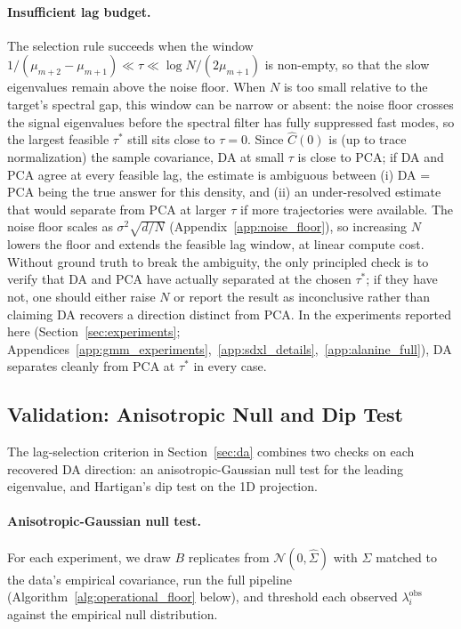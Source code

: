 \documentclass{article}
\begin{document}
\paragraph{Insufficient lag budget.}
The selection rule succeeds when the window
$1/(\mu_{m+2} - \mu_{m+1}) \ll \tau \ll \log N / (2\mu_{m+1})$ is non-empty, so that the slow eigenvalues remain above the noise floor.
When $N$ is too small relative to the target's spectral gap, this
window can be narrow or absent: the noise floor crosses the signal
eigenvalues before the spectral filter has fully suppressed fast
modes, so the largest feasible $\tau^*$ still sits close to $\tau = 0$.
Since $\hat C(0)$ is (up to trace normalization) the sample covariance,
DA at small $\tau$ is close to PCA; if DA and PCA agree at every
feasible lag, the estimate is ambiguous between (i) DA = PCA being the
true answer for this density, and (ii) an under-resolved estimate that
would separate from PCA at larger $\tau$ if more trajectories were
available. The noise floor scales as $\sigma^2\sqrt{d/N}$
(Appendix~\ref{app:noise_floor}), so increasing $N$ lowers the floor
and extends the feasible lag window, at linear compute cost. Without
ground truth to break the ambiguity, the only principled check is to
verify that DA and PCA have actually separated at the chosen $\tau^*$;
if they have not, one should either raise $N$ or report the result as
inconclusive rather than claiming DA recovers a direction distinct from
PCA. In the experiments reported here (Section~\ref{sec:experiments}; Appendices~\ref{app:gmm_experiments},~\ref{app:sdxl_details},~\ref{app:alanine_full}), DA separates cleanly from PCA at $\tau^*$ in every case.

\subsection{Validation: Anisotropic Null and Dip Test}
\label{app:validation}

The lag-selection criterion in Section~\ref{sec:da} combines two checks on each recovered DA direction: an anisotropic-Gaussian null test for the leading eigenvalue, and Hartigan's dip test on the 1D projection.

\paragraph{Anisotropic-Gaussian null test.}
For each experiment, we draw $B$ replicates from $\mathcal{N}(0, \hat\Sigma)$ with $\hat\Sigma$ matched to the data's empirical covariance, run the full pipeline (Algorithm~\ref{alg:operational_floor} below), and threshold each observed $\lambda_i^{\mathrm{obs}}$ against the empirical null distribution.
\end{document}
